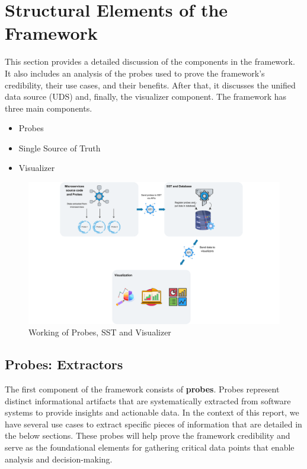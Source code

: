 \section{Structural Elements of the Framework}\label{sec:tech-strategy}

This section provides a detailed discussion of the components in the framework. It also includes an analysis of the probes used to prove the framework's credibility, their use cases, and their benefits. After that, it discusses the unified data source (UDS) and, finally, the visualizer component. The framework has three main components.
\begin{itemize}
    \item Probes
    \item Single Source of Truth
    \item Visualizer
\end{itemize}

\begin{figure}[H]
    \centering
    \includegraphics[width=1\textwidth]{figures/vision.png}
    \caption[Framework working]{Working of Probes, SST and Visualizer}
	\label{fig_vision}
\end{figure}

\subsection{Probes: Extractors}\label{sec:component-probes}

The first component of the framework consists of \textbf{probes}. Probes represent distinct informational artifacts that are systematically extracted from software systems to provide insights and actionable data. In the context of this report, we have several use cases to extract specific pieces of information that are detailed in the below sections. These probes will help prove the framework credibility and serve as the foundational elements for gathering critical data points that enable analysis and decision-making. 

